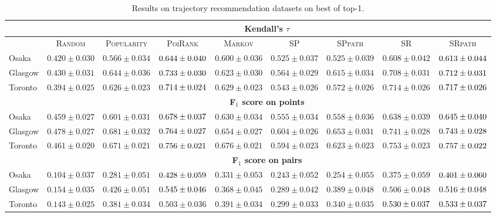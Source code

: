 \begin{table*}[!h]
\centering
\small
\setlength{\tabcolsep}{3pt} %
\begin{tabular}{l|cc|ccc|ccc} \hline
& \multicolumn{8}{c}{\bf Kendall's $\tau$} \\ \hline
 & \textsc{Random} & \textsc{Popularity} & \textsc{PoiRank} & \textsc{Markov} & \textsc{SP} & \textsc{SPpath} & \textsc{SR} & \textsc{SRpath} \\ \hline
Osaka & $0.420\pm0.030$ & $0.566\pm0.034$ & $\firstBest{0.644\pm0.040}$ & $0.600\pm0.036$ & $0.525\pm0.037$ & $0.525\pm0.039$ & $0.608\pm0.042$ & $\secondBest{0.613\pm0.044}$ \\
Glasgow & $0.430\pm0.031$ & $0.644\pm0.036$ & $\firstBest{0.733\pm0.030}$ & $0.623\pm0.030$ & $0.564\pm0.029$ & $0.615\pm0.034$ & $0.708\pm0.031$ & $\secondBest{0.712\pm0.031}$ \\
Toronto & $0.394\pm0.025$ & $0.626\pm0.023$ & $\secondBest{0.714\pm0.024}$ & $0.629\pm0.023$ & $0.543\pm0.026$ & $0.572\pm0.026$ & $0.714\pm0.026$ & $\firstBest{0.717\pm0.026}$ \\
\hline
& \multicolumn{8}{c}{\bf F$_1$ score on points} \\ \hline
Osaka & $0.459\pm0.027$ & $0.601\pm0.031$ & $\firstBest{0.678\pm0.037}$ & $0.630\pm0.034$ & $0.555\pm0.034$ & $0.558\pm0.036$ & $0.638\pm0.039$ & $\secondBest{0.645\pm0.040}$ \\
Glasgow & $0.478\pm0.027$ & $0.681\pm0.032$ & $\firstBest{0.764\pm0.027}$ & $0.654\pm0.027$ & $0.604\pm0.026$ & $0.653\pm0.031$ & $0.741\pm0.028$ & $\secondBest{0.743\pm0.028}$ \\
Toronto & $0.461\pm0.020$ & $0.671\pm0.021$ & $\secondBest{0.756\pm0.021}$ & $0.676\pm0.021$ & $0.594\pm0.023$ & $0.623\pm0.023$ & $0.753\pm0.023$ & $\firstBest{0.757\pm0.022}$ \\
\hline
& \multicolumn{8}{c}{\bf F$_1$ score on pairs} \\ \hline
Osaka & $0.104\pm0.037$ & $0.281\pm0.051$ & $\firstBest{0.428\pm0.059}$ & $0.331\pm0.053$ & $0.243\pm0.052$ & $0.254\pm0.055$ & $0.375\pm0.059$ & $\secondBest{0.401\pm0.060}$ \\
Glasgow & $0.154\pm0.035$ & $0.426\pm0.051$ & $\firstBest{0.545\pm0.046}$ & $0.368\pm0.045$ & $0.289\pm0.042$ & $0.389\pm0.048$ & $0.506\pm0.048$ & $\secondBest{0.516\pm0.048}$ \\
Toronto & $0.143\pm0.025$ & $0.381\pm0.034$ & $0.503\pm0.036$ & $0.391\pm0.034$ & $0.299\pm0.033$ & $0.340\pm0.035$ & $\secondBest{0.530\pm0.037}$ & $\firstBest{0.533\pm0.037}$ \\
\hline
\end{tabular}
\caption{Results on trajectory recommendation datasets on best of top-1.}
\end{table*}



